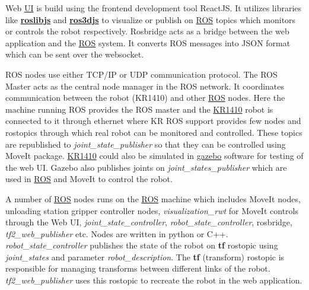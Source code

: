Web \hyperref[acro:UI]{UI} is build using the frontend development tool ReactJS. It utilizes libraries like \hyperref[par:roslibjs]{\textbf{roslibjs}} and \hyperref[par:ros3djs]{\textbf{ros3djs}} to visualize or publish on \hyperref[acro:ROS]{ROS} topics which monitors or controls the robot respectively. Rosbridge acts as a bridge between the web application and the \hyperref[acro:ROS]{ROS} system. It converts ROS messages into JSON format which can be sent over the websocket.

ROS nodes use either TCP/IP or UDP communication protocol. 
The ROS Master acts as the central node manager in the ROS network. It coordinates communication between the robot (KR1410) and other \hyperref[acro:ROS]{ROS} nodes.
Here the machine running ROS provides the ROS master \cite{rosmaster} and the \hyperref[acro:KR]{KR1410} robot is connected to it through ethernet where KR ROS support provides few nodes and rostopics through which real robot can be monitored and controlled. These topics are republished to \textit{joint\_state\_publisher} so that they can be controlled using MoveIt package.
\hyperref[acro:KR]{KR1410} could also be simulated in \hyperref[acro:Gazebo]{gazebo} software for testing of the web UI. Gazebo also publishes joints on \textit{joint\_states\_publisher} which are used in \hyperref[acro:ROS]{ROS} and MoveIt to control the robot.

A number of \hyperref[acro:ROS]{ROS} nodes runs on the \hyperref[acro:ROS]{ROS} machine which includes MoveIt nodes, unloading station gripper controller nodes, \textit{visualization\_rwt} for MoveIt controls through the Web UI, \textit{joint\_state\_controller}, \textit{robot\_state\_controller}, rosbridge, \textit{tf2\_web\_publisher} etc. Nodes are written in python or C++. \textit{robot\_state\_controller} publishes the state of the robot on \textbf{tf} rostopic using \textit{joint\_states} and parameter \textit{robot\_description}. The \textbf{tf} (transform) rostopic is responsible for managing transforms between different links of the robot. \textit{tf2\_web\_publisher} uses this rostopic to recreate the robot in the web application.

